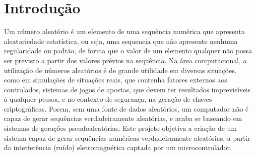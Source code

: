 \section{Introdução}
Um número aleatório é um elemento de uma sequência numérica que apresenta aleatoriedade estatística, ou seja, uma sequencia que não apresente nenhuma regularidade ou padrão, de forma que o valor de um elemento qualquer não possa ser previsto a partir dos valores prévios na sequência.
Na área computacional, a utilização de números aleatórios é de grande utilidade em diversas situações, como em simulações de situações reais, que contenha fatores externos aos controlados, sistemas de jogos de apostas, que devem ter resultados imprevisíveis à qualquer pessoa, e no contexto de segurança, na geração de chaves criptográficas.
Porem, sem uma fonte de dados aleatórios, um computador não é capaz de gerar sequências verdadeiramente aleatórias, e acaba se baseando em sistemas de gerações pseudoaleatórias. Este projeto objetiva a criação de um sistema capaz de gerar sequências numéricas verdadeiramente aleatórias, a partir da interferência (ruído) eletromagnética captada por um microcontrolador.